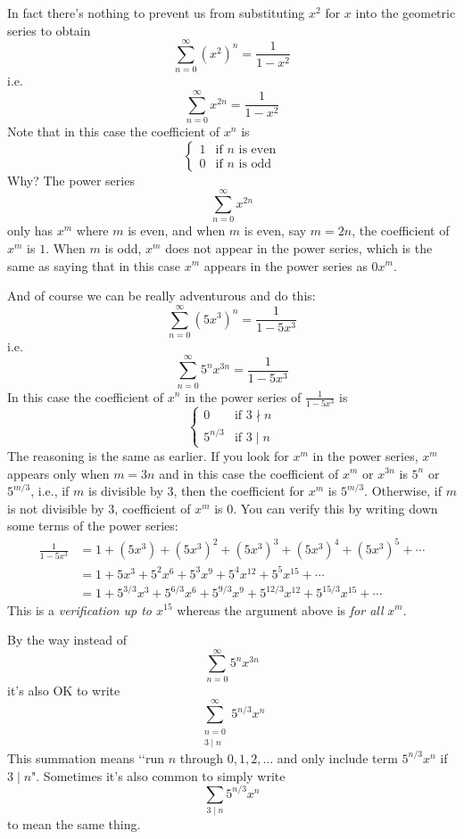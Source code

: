 In fact there's nothing to prevent us from substituting $x^2$ for $x$ into
the geometric series to obtain
\[
\sum_{n=0}^\infty (x^2)^n = \frac{1}{1 - x^2}
\]
i.e.
\[
\sum_{n=0}^\infty x^{2n} = \frac{1}{1 - x^2}
\]
Note that in this case the coefficient of $x^n$ is
\[
\begin{cases}
1 & \text{if $n$ is even} \\
0 & \text{if $n$ is odd} 
\end{cases}
\]
Why?
The power series
\[
\sum_{n=0}^\infty x^{2n}
\]
only has $x^m$ where $m$ is even, and when $m$ is even, say $m = 2n$,
the coefficient of $x^m$ is $1$.
When $m$ is odd, $x^m$ does not appear in the power series,
which is the same as saying that in this case $x^m$ appears in the
power series as $0x^m$.

And of course we can be really adventurous and do this:
\[
\sum_{n=0}^\infty (5x^3)^n = \frac{1}{1 - 5x^3}
\]
i.e.
\[
\sum_{n=0}^\infty 5^n x^{3n} = \frac{1}{1 - 5x^3}
\]
In this case the coefficient of $x^n$ in the power series
of $\displaystyle \frac{1}{1 - 5x^3}$
is
\[
\begin{cases}
0 & \text{if $3 \nmid n$} \\
5^{n/3} & \text{if $3 \mid n$}
\end{cases}
\]
The reasoning is the same as earlier.
If you look for $x^m$ in the power series, $x^m$ appears
only when $m = 3n$
and in this case the coefficient of $x^m$ or $x^{3n}$ is
$5^{n}$ or $5^{m/3}$, i.e., if $m$ is divisible by $3$,
then the coefficient for $x^m$ is $5^{m/3}$.
Otherwise, if $m$ is not divisible by $3$, coefficient of $x^m$ is $0$.
You can verify this by writing down some terms of the power series:
\begin{align*}
\frac{1}{1 - 5x^3}
&= 1 + (5x^3) + (5x^3)^2 + (5x^3)^3 + (5x^3)^4 + (5x^3)^5 + \cdots \\
&= 1 + 5x^3 + 5^2x^6 + 5^3x^9 + 5^4x^{12} + 5^5x^{15} + \cdots \\
&= 1 + 5^{3/3}x^3 + 5^{6/3}x^6 + 5^{9/3}x^9 + 5^{12/3}x^{12} + 5^{15/3}x^{15} + \cdots
\end{align*}
This is a \textit{verification up to $x^{15}$} whereas the argument above
is \textit{for all} $x^m$.

By the way instead of
\[
\sum_{n=0}^\infty 5^n x^{3n}
\]
it's also OK to write
\[
\sum_{\substack{n = 0 \\ 3 \mid n}}^\infty 5^{n/3} x^{n}
\]
This summation means \lq\lq run $n$ through $0,1,2,...$ and
only include term $5^{n/3} x^{n}$ if $3 \mid n$".
Sometimes it's also common to simply write
\[
\sum_{3 \mid n} 5^{n/3} x^{n}
\]
to mean the same thing.


